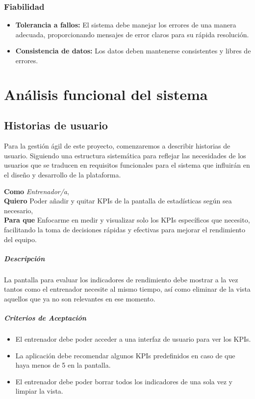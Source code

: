 \subsubsection{Fiabilidad}
\begin{itemize}
    \item \textbf{Tolerancia a fallos:} El sistema debe manejar los errores de una manera adecuada, proporcionando mensajes de error claros para su rápida resolución.
    
    \item \textbf{Consistencia de datos:} Los datos deben mantenerse consistentes y libres de errores.
    
\end{itemize}

\section{Análisis funcional del sistema}

\subsection{Historias de usuario}

Para la gestión ágil de este proyecto, comenzaremos a describir historias de usuario. Siguiendo una estructura sistemática para reflejar las necesidades de los usuarios que se traducen en requisitos funcionales para el sistema que influirán en el diseño y desarrollo de la plataforma.

\begin{tcolorbox}[title= Añadir KPIs a la pantalla de estadísticas]
\textbf{Como} \textit{Entrenador/a},\\
\textbf{Quiero} Poder añadir y quitar KPIs de la pantalla de estadísticas según sea necesario,\\
\textbf{Para que} Enfocarme en medir y visualizar solo los KPIs específicos que necesito, facilitando la toma de decisiones rápidas y efectivas para mejorar el rendimiento del equipo.
\end{tcolorbox}

\subparagraph{Descripción}
La pantalla para evaluar los indicadores de rendimiento debe mostrar a la vez tantos como el entrenador necesite al mismo tiempo, así como eliminar de la vista aquellos que ya no son relevantes en ese momento.

\subparagraph{Criterios de Aceptación}
\begin{itemize}
    \item El entrenador debe poder acceder a una interfaz de usuario para ver los KPIs.
    \item La aplicación debe recomendar algunos KPIs predefinidos en caso de que haya menos de 5 en la pantalla.
    \item El entrenador debe poder borrar todos los indicadores de una sola vez y limpiar la vista.
\end{itemize}

